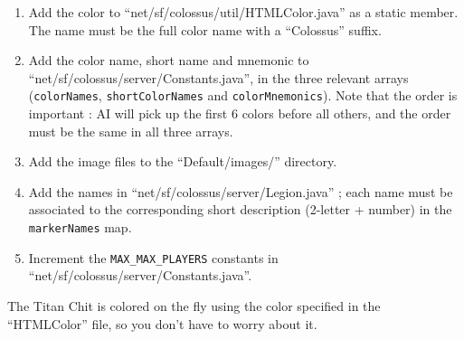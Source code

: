 \documentclass{article}
\begin{document}
\begin{enumerate}

\item Add the color to ``net/sf/colossus/util/HTMLColor.java'' as a static member. The name must be the full color name with a ``Colossus'' suffix.

\item Add the color name, short name and mnemonic to ``net/sf/colossus/server/Constants.java'', in the three relevant arrays (\texttt{colorNames}, \texttt{shortColorNames} and \texttt{colorMnemonics}). Note that the order is important : AI will pick up the first 6 colors before all others, and the order must be the same in all three arrays.

\item Add the image files to the ``Default/images/'' directory.

\item Add the names in ``net/sf/colossus/server/Legion.java'' ; each name must be associated to the corresponding short description (2-letter + number) in the \texttt{markerNames} map.

\item Increment the \texttt{MAX\_MAX\_PLAYERS} constants in ``net/sf/colossus/server/Constants.java''.

\end{enumerate}

The Titan Chit is colored on the fly using the color specified in the ``HTMLColor'' file, so you don't have to worry about it.
\end{document}
